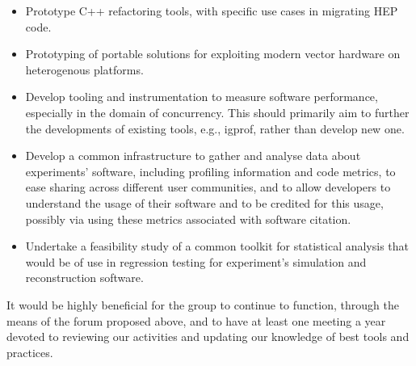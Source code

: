 \documentclass[12pt,a4paper]{article}
\begin{document}
\begin{itemize}
\item
    Prototype C++ refactoring tools, with specific use cases in migrating
  HEP code.
  \item
    Prototyping of portable solutions for exploiting modern vector
  hardware on heterogenous platforms.
  \item
    Develop tooling and instrumentation to measure software performance,
  especially in the domain of concurrency. This should primarily aim to
  further the developments of existing tools, e.g., igprof, rather than
  develop new one.
  \item
    Develop a common infrastructure to gather and analyse data about
  experiments' software, including profiling information and code
  metrics, to ease sharing across different user communities, and to
  allow developers to understand the usage of their software and to be
  credited for this usage, possibly via using these metrics associated
  with software citation.
  \item
    Undertake a feasibility study of a common toolkit for statistical
  analysis that would be of use in regression testing for experiment's
  simulation and reconstruction software.
\end{itemize}

It would be highly beneficial for the group to continue to function,
through the means of the forum proposed above, and to have at least one
meeting a year devoted to reviewing our activities and updating our
knowledge of best tools and practices.

\sloppy
\raggedright
\clearpage
\printbibliography[title={References},heading=bibintoc]
\end{document}
